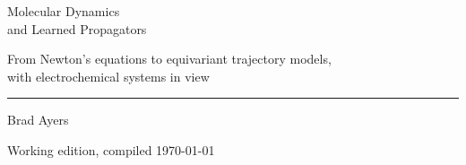 \begin{titlepage}
   \vspace*{0.22\textheight}
   {\raggedright
   {\fontsize{30}{36}\selectfont Molecular Dynamics\\[4pt]
    and Learned Propagators}\par
   \vspace{14pt}
   {\large\color{black!60}From Newton's equations to equivariant
    trajectory models,\\ with electrochemical systems in view}\par
   \vspace{28pt}
   {\color{thesisaccent}\rule{0.18\textwidth}{0.6pt}}\par
   \vspace{20pt}
   {\large Brad Ayers}\par
   \vspace{4pt}
   {\small\color{black!60}Working edition, compiled \today}\par}
\end{titlepage}
